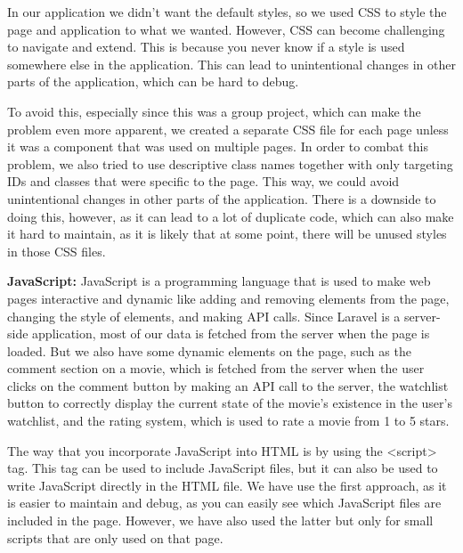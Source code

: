 In our application we didn't want the default styles, so we used CSS to style the page and application to what we wanted.
However, CSS can become challenging to navigate and extend. This is because you never know if a style is used somewhere else in the application.
This can lead to unintentional changes in other parts of the application, which can be hard to debug.\newline

To avoid this, especially since this was a group project, which can make the problem even more apparent, we created a separate CSS file for each page unless it was a component that was used on multiple pages.
In order to combat this problem, we also tried to use descriptive class names together with only targeting IDs and classes that were specific to the page.
This way, we could avoid unintentional changes in other parts of the application.
There is a downside to doing this, however, as it can lead to a lot of duplicate code, which can also make it hard to maintain, as it is likely that at some point, there will be unused styles in those CSS files.\newline

\textbf{JavaScript:} \newline
JavaScript is a programming language that is used to make web pages interactive and dynamic like adding and removing elements from the page, changing the style of elements, and making API calls.
Since Laravel is a server-side application, most of our data is fetched from the server when the page is loaded.
But we also have some dynamic elements on the page, such as the comment section on a movie,
which is fetched from the server when the user clicks on the comment button by making an API call to the server,
the watchlist button to correctly display the current state of the movie's existence in the user's watchlist,
and the rating system, which is used to rate a movie from 1 to 5 stars.\newline

The way that you incorporate JavaScript into HTML is by using the \textless{}script\textgreater{} tag.
This tag can be used to include JavaScript files, but it can also be used to write JavaScript directly in the HTML file.
We have use the first approach, as it is easier to maintain and debug, as you can easily see which JavaScript files are included in the page.
However, we have also used the latter but only for small scripts that are only used on that page.\newline







